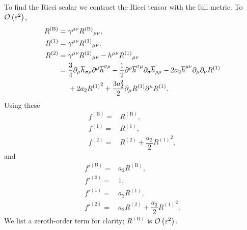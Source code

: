 To find the Ricci scalar we contract the Ricci tensor with the full metric. To $\mathcal{O}\left({\varepsilon^2}\right)$,
\begin{subequations}
\begin{align}
R^{(\text{B})} = {} & \gamma^{\mu\nu} {R^{(\text{B})}}_{\mu\nu}, \\
R^{(1)} = {} & \gamma^{\mu\nu} {R^{(1)}}_{\mu\nu}, \\
R^{(2)} = {} & \gamma^{\mu\nu} {R^{(2)}}_{\mu\nu} - h^{\mu\nu} {R^{(1)}}_{\mu\nu} \nonumber \\*
 = {} & \dfrac{3}{4}\partial_\mu\overline{h}_{\sigma\rho}\partial^\mu\overline{h}^{\sigma\rho} - \dfrac{1}{2} \partial^\rho\overline{h}^{\sigma\mu}\partial_\sigma\overline{h}_{\rho\mu} - 2a_2 \overline{h}^{\mu\nu}\partial_\mu\partial_\nu R^{(1)} \nonumber \\*
  & + {} 2 a_2 {R^{(1)}}^2 + \dfrac{3a_2^2}{2}\partial_\mu R^{(1)} \partial^\mu R^{(1)}.
\end{align}
\end{subequations}
Using these
\begin{subequations}
\begin{align}
f^{(\text{B})} = {} & R^{(\text{B})}, \\
f^{(1)} = {} & R^{(1)}, \\
f^{(2)} = {} & R^{(2)} + \dfrac{a_2}{2}{R^{(1)}}^2,
\end{align}
\end{subequations}
and
\begin{subequations}
\begin{align}
f'^{(\text{B})} = {} & a_2 R^{(\text{B})}, \\
f'^{(0)} = {} & 1, \\
f'^{(1)} = {} & a_2 R^{(1)}, \\
f'^{(2)} = {} & a_2 R^{(2)} + \dfrac{a_3}{2}{R^{(1)}}^2.
\end{align}
\end{subequations}
We list a zeroth-order term for clarity; $R^{(\text{B})}$ is $\mathcal{O}\left({\varepsilon^2}\right)$.


